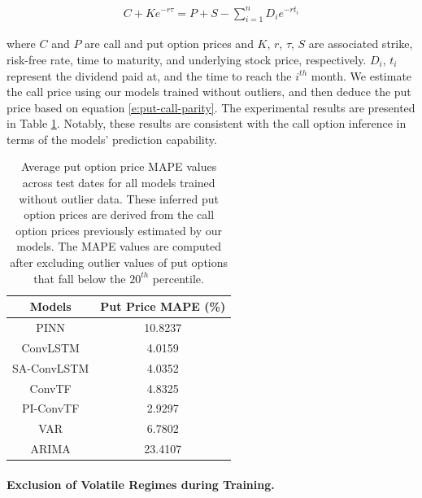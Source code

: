 \documentclass{article}
\begin{document}
\begin{equation} 
\begin{split}
    C + Ke^{-r\tau} = P + S - \sum_{i=1}^{n} D_{i}e^{-rt_{i}}
\end{split} \label{e:put-call-parity}
\end{equation}

where $C$ and $P$ are call and put option prices and $K$, $r$, $\tau$, $S$ are associated strike, risk-free rate, time to maturity, and underlying stock price, respectively. $D_{i}$, $t_{i}$ represent the dividend paid at, and the time to reach the $i^{th}$ month. 
We estimate the call price using our models trained without outliers, and then deduce the put price based on equation \ref{e:put-call-parity}. The experimental results are presented in Table \ref{table:put_MAPE}. Notably, these results are consistent with the call option inference in terms of the models' prediction capability.

\begin{table}[htp]
    \centering
    \begin{tabular}{|c c|}
         \hline
         Models & Put Price MAPE (\%) \\ 
         \hline\hline
         PINN & 10.8237 \\
         \hline
         ConvLSTM & 4.0159 \\
         \hline
         SA-ConvLSTM & 4.0352 \\
         \hline
         ConvTF & 4.8325 \\
         \hline
         PI-ConvTF & 2.9297 \\
         \hline
         VAR & 6.7802 \\
         \hline
         ARIMA & 23.4107 \\
         \hline
    \end{tabular}
    \captionsetup{skip=10pt}
    \caption{Average put option price MAPE values across test dates for all models trained without outlier data. These inferred put option prices are derived from the call option prices previously estimated by our models. The MAPE values are computed after excluding outlier values of put options that fall below the  $20^{th}$ percentile.}
    \label{table:put_MAPE}
\end{table}


\paragraph{Exclusion of Volatile Regimes during Training.}
\end{document}
